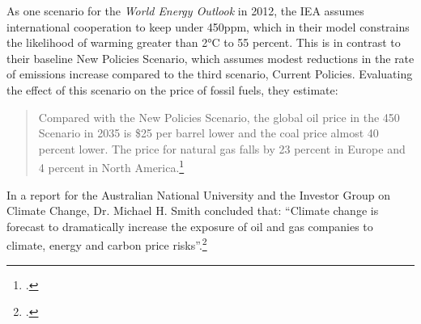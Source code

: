 \documentclass[10pt]{article}
\begin{document}
As one scenario for the \emph{World Energy Outlook} in 2012, the IEA assumes international cooperation to keep  under 450ppm, which in their model constrains the likelihood of warming greater than 2°C to 55 percent. 
This is in contrast to their baseline New Policies Scenario, which assumes modest reductions in the rate of emissions increase compared to the third scenario, Current Policies. 
Evaluating the effect of this scenario on the price of fossil fuels, they estimate:
\begin{quote}
Compared with the New Policies Scenario, the global oil price in the 450 Scenario in 2035 is \$25 per barrel lower and the coal price almost 40 percent lower. The price for natural gas falls by 23 percent in Europe and 4 percent in North America.\footcite[][p. 257]{IEA2012}
\end{quote}
In a report for the Australian National University and the Investor Group on Climate Change, Dr. Michael H. Smith concluded that: ``Climate change is forecast to dramatically increase the exposure of oil and gas companies to climate, energy and carbon price risks''.\footcite[][p. 14]{RisksForInvestors}
\end{document}
